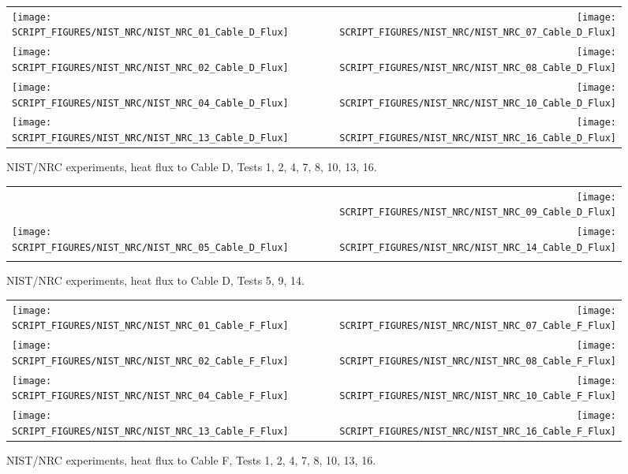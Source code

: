 \begin{figure}[p]
\begin{tabular*}{\textwidth}{l@{\extracolsep{\fill}}r}
\texttt{[image: SCRIPT\_FIGURES/NIST\_NRC/NIST\_NRC\_01\_Cable\_D\_Flux]} &
\texttt{[image: SCRIPT\_FIGURES/NIST\_NRC/NIST\_NRC\_07\_Cable\_D\_Flux]} \\
\texttt{[image: SCRIPT\_FIGURES/NIST\_NRC/NIST\_NRC\_02\_Cable\_D\_Flux]} &
\texttt{[image: SCRIPT\_FIGURES/NIST\_NRC/NIST\_NRC\_08\_Cable\_D\_Flux]} \\
\texttt{[image: SCRIPT\_FIGURES/NIST\_NRC/NIST\_NRC\_04\_Cable\_D\_Flux]} &
\texttt{[image: SCRIPT\_FIGURES/NIST\_NRC/NIST\_NRC\_10\_Cable\_D\_Flux]} \\
\texttt{[image: SCRIPT\_FIGURES/NIST\_NRC/NIST\_NRC\_13\_Cable\_D\_Flux]} &
\texttt{[image: SCRIPT\_FIGURES/NIST\_NRC/NIST\_NRC\_16\_Cable\_D\_Flux]}
\end{tabular*}
\caption[NIST/NRC experiments, heat flux to Cable D, Tests 1, 2, 4, 7, 8, 10, 13, 16]
{NIST/NRC experiments, heat flux to Cable D, Tests 1, 2, 4, 7, 8, 10, 13, 16.}
\label{NIST_NRC_Cable_D_Flux_Closed}
\end{figure}

\begin{figure}[p]
\begin{tabular*}{\textwidth}{l@{\extracolsep{\fill}}r}
                           &
\texttt{[image: SCRIPT\_FIGURES/NIST\_NRC/NIST\_NRC\_09\_Cable\_D\_Flux]} \\
\texttt{[image: SCRIPT\_FIGURES/NIST\_NRC/NIST\_NRC\_05\_Cable\_D\_Flux]} &
\texttt{[image: SCRIPT\_FIGURES/NIST\_NRC/NIST\_NRC\_14\_Cable\_D\_Flux]} \\
                      &
\end{tabular*}
\caption[NIST/NRC experiments, heat flux to Cable D, Tests 5, 9, 14]
{NIST/NRC experiments, heat flux to Cable D, Tests 5, 9, 14.}
\label{NIST_NRC_Cable_D_Flux_Open}
\end{figure}

\begin{figure}[p]
\begin{tabular*}{\textwidth}{l@{\extracolsep{\fill}}r}
\texttt{[image: SCRIPT\_FIGURES/NIST\_NRC/NIST\_NRC\_01\_Cable\_F\_Flux]} &
\texttt{[image: SCRIPT\_FIGURES/NIST\_NRC/NIST\_NRC\_07\_Cable\_F\_Flux]} \\
\texttt{[image: SCRIPT\_FIGURES/NIST\_NRC/NIST\_NRC\_02\_Cable\_F\_Flux]} &
\texttt{[image: SCRIPT\_FIGURES/NIST\_NRC/NIST\_NRC\_08\_Cable\_F\_Flux]} \\
\texttt{[image: SCRIPT\_FIGURES/NIST\_NRC/NIST\_NRC\_04\_Cable\_F\_Flux]} &
\texttt{[image: SCRIPT\_FIGURES/NIST\_NRC/NIST\_NRC\_10\_Cable\_F\_Flux]} \\
\texttt{[image: SCRIPT\_FIGURES/NIST\_NRC/NIST\_NRC\_13\_Cable\_F\_Flux]} &
\texttt{[image: SCRIPT\_FIGURES/NIST\_NRC/NIST\_NRC\_16\_Cable\_F\_Flux]}
\end{tabular*}
\caption[NIST/NRC experiments, heat flux to Cable F, Tests 1, 2, 4, 7, 8, 10, 13, 16]
{NIST/NRC experiments, heat flux to Cable F, Tests 1, 2, 4, 7, 8, 10, 13, 16.}
\label{NIST_NRC_Cable_F_Flux_Closed}
\end{figure}

